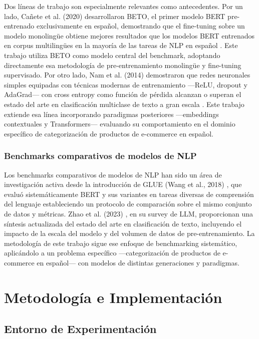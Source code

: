 \documentclass[11pt,a4paper]{article}
\begin{document}
Dos líneas de trabajo son especialmente relevantes como antecedentes. Por un lado, Cañete et al. (2020) desarrollaron BETO, el primer modelo BERT pre-entrenado exclusivamente en español, demostrando que el fine-tuning sobre un modelo monolingüe obtiene mejores resultados que los modelos BERT entrenados en corpus multilingües en la mayoría de las tareas de NLP en español \cite{canete2020}. Este trabajo utiliza BETO como modelo central del benchmark, adoptando directamente esa metodología de pre-entrenamiento monolingüe y fine-tuning supervisado. Por otro lado, Nam et al. (2014) demostraron que redes neuronales simples equipadas con técnicas modernas de entrenamiento ---ReLU, dropout y AdaGrad--- con cross entropy como función de pérdida alcanzan o superan el estado del arte en clasificación multiclase de texto a gran escala \cite{nam2014}. Este trabajo extiende esa línea incorporando paradigmas posteriores ---embeddings contextuales y Transformers--- evaluando su comportamiento en el dominio específico de categorización de productos de e-commerce en español.

\subsubsection{Benchmarks comparativos de modelos de NLP}

Los benchmarks comparativos de modelos de NLP han sido un área de investigación activa desde la introducción de GLUE (Wang et al., 2018) \cite{wang2018}, que evaluó sistemáticamente BERT y sus variantes en tareas diversas de comprensión del lenguaje estableciendo un protocolo de comparación sobre el mismo conjunto de datos y métricas. Zhao et al. (2023) \cite{zhao2023}, en su survey de LLM, proporcionan una síntesis actualizada del estado del arte en clasificación de texto, incluyendo el impacto de la escala del modelo y del volumen de datos de pre-entrenamiento. La metodología de este trabajo sigue ese enfoque de benchmarking sistemático, aplicándolo a un problema específico ---categorización de productos de e-commerce en español--- con modelos de distintas generaciones y paradigmas.

\section{Metodología e Implementación}

\subsection{Entorno de Experimentación}
\end{document}
